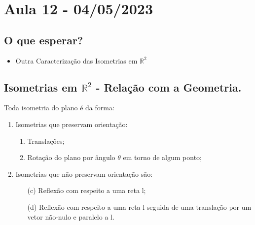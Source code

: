 \documentclass[Algebra/algebra_notes.tex]{subfiles}
\begin{document}
\section{Aula 12 - 04/05/2023}
\subsection{O que esperar?}
\begin{itemize}
	\item Outra Caracterização das Isometrias em $\mathbb{R}^{2}$
\end{itemize}
\subsection{Isometrias em $\mathbb{R}^{2}$ - Relação com a Geometria.}
\begin{theorem*}
	Toda isometria do plano é da forma:
	\begin{enumerate}
		\item Isometrias que preservam orientação:
		      \begin{enumerate}
			      \item Translações;
			      \item Rotação do plano por ângulo $\theta $ em torno de algum ponto;
		      \end{enumerate}
		\item Isometrias que não preservam orientação são:
		      \begin{enumerate}
			      \item[(c)] Reflexão com respeito a uma reta l;
			      \item[(d)] Reflexão com respeito a uma reta l seguida de uma translação por um vetor não-nulo e
			            paralelo a l.
		      \end{enumerate}
	\end{enumerate}
\end{theorem*}
\end{document}
